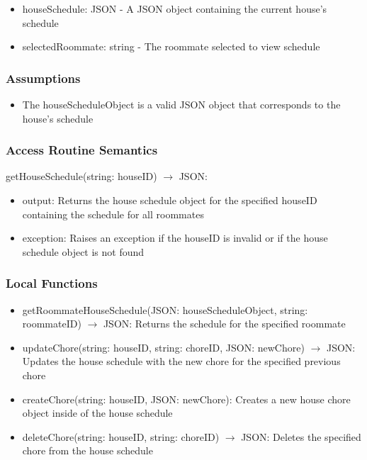 \documentclass[12pt, titlepage]{article}
\begin{document}
\begin{itemize}
  \item houseSchedule: JSON - A JSON object containing the current house's schedule
  \item selectedRoommate: string - The roommate selected to view schedule
\end{itemize}


\subsubsection{Assumptions}

\begin{itemize}
  \item The houseScheduleObject is a valid JSON object that corresponds to the house's schedule
\end{itemize}

\subsubsection{Access Routine Semantics}

\noindent getHouseSchedule(string: houseID) $\rightarrow$ JSON:
\begin{itemize}
\item output: Returns the house schedule object for the specified houseID containing the schedule for all roommates
\item exception: Raises an exception if the houseID is invalid or if the house schedule object is not found
\end{itemize}


\subsubsection{Local Functions}

\begin{itemize}
  \item getRoommateHouseSchedule(JSON: houseScheduleObject, string: roommateID) $\rightarrow$ JSON: Returns the schedule for the specified roommate
  \item updateChore(string: houseID, string: choreID, JSON: newChore) $\rightarrow$ JSON: Updates the house schedule with the new chore for the specified previous chore
  \item createChore(string: houseID, JSON: newChore): Creates a new house chore object inside of the house schedule
  \item deleteChore(string: houseID, string: choreID) $\rightarrow$ JSON: Deletes the specified chore from the house schedule

\end{itemize}
\end{document}
